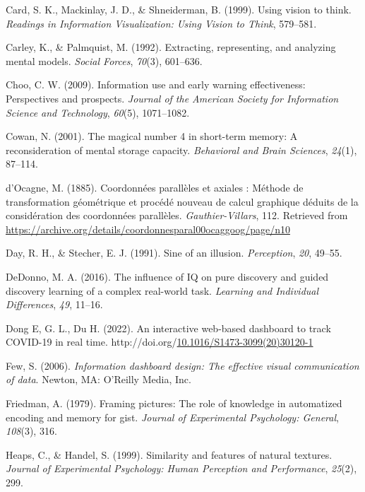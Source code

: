 \documentclass[print]{nuthesis}
\newlength{\cslhangindent}
\newenvironment{CSLReferences}[2]%
{\setlength{\parindent}{0pt}%
\everypar{\setlength{\hangindent}{\cslhangindent}}\ignorespaces}%
{\par}
\begin{document}
\begin{CSLReferences}{1}{0}
\leavevmode\hypertarget{ref-card1999}{}%
Card, S. K., Mackinlay, J. D., \& Shneiderman, B. (1999). Using vision to think. \emph{Readings in Information Visualization: Using Vision to Think}, 579--581.

\leavevmode\hypertarget{ref-carley1992}{}%
Carley, K., \& Palmquist, M. (1992). Extracting, representing, and analyzing mental models. \emph{Social Forces}, \emph{70}(3), 601--636.

\leavevmode\hypertarget{ref-choo2009}{}%
Choo, C. W. (2009). Information use and early warning effectiveness: Perspectives and prospects. \emph{Journal of the American Society for Information Science and Technology}, \emph{60}(5), 1071--1082.

\leavevmode\hypertarget{ref-cowan2001}{}%
Cowan, N. (2001). The magical number 4 in short-term memory: A reconsideration of mental storage capacity. \emph{Behavioral and Brain Sciences}, \emph{24}(1), 87--114.

\leavevmode\hypertarget{ref-dOcagne:1885}{}%
d'Ocagne, M. (1885). {Coordonnées parallèles et axiales : Méthode de transformation géométrique et procédé nouveau de calcul graphique déduits de la considération des coordonnées parallèles}. \emph{Gauthier-Villars}, 112. Retrieved from \url{https://archive.org/details/coordonnesparal00ocaggoog/page/n10}

\leavevmode\hypertarget{ref-sine}{}%
Day, R. H., \& Stecher, E. J. (1991). Sine of an illusion. \emph{Perception}, \emph{20}, 49--55.

\leavevmode\hypertarget{ref-dedonno}{}%
DeDonno, M. A. (2016). The influence of IQ on pure discovery and guided discovery learning of a complex real-world task. \emph{Learning and Individual Differences}, \emph{49}, 11--16.

\leavevmode\hypertarget{ref-JHPHDashboard}{}%
Dong E, G. L., Du H. (2022). An interactive web-based dashboard to track COVID-19 in real time. http://doi.org/\href{https://doi.org/10.1016/S1473-3099(20)30120-1}{10.1016/S1473-3099(20)30120-1}

\leavevmode\hypertarget{ref-few}{}%
Few, S. (2006). \emph{Information dashboard design: The effective visual communication of data}. Newton, MA: O'Reilly Media, Inc.

\leavevmode\hypertarget{ref-friedman1979}{}%
Friedman, A. (1979). Framing pictures: The role of knowledge in automatized encoding and memory for gist. \emph{Journal of Experimental Psychology: General}, \emph{108}(3), 316.

\leavevmode\hypertarget{ref-heaps1999}{}%
Heaps, C., \& Handel, S. (1999). Similarity and features of natural textures. \emph{Journal of Experimental Psychology: Human Perception and Performance}, \emph{25}(2), 299.


\end{CSLReferences}
\end{document}
